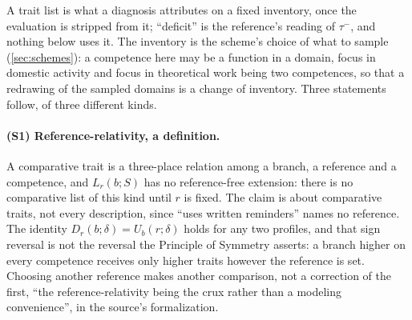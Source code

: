 \noindent A trait list is what a diagnosis attributes on a fixed inventory, once the evaluation is stripped from it; ``deficit'' is the reference's reading of $\tau^{-}$, and nothing below uses it. The inventory is the scheme's choice of what to sample (\autoref{sec:schemes}): a competence here may be a function in a domain, focus in domestic activity and focus in theoretical work being two competences, so that a redrawing of the sampled domains is a change of inventory. Three statements follow, of three different kinds.

\paragraph{(S1) Reference-relativity, a definition.} A comparative trait is a three-place relation among a branch, a reference and a competence, and $L_r(b; S)$ has no reference-free extension: there is no comparative list of this kind until $r$ is fixed. The claim is about comparative traits, not every description, since ``uses written reminders'' names no reference. The identity $D_r(b;\delta) = U_b(r;\delta)$ holds for any two profiles, and that sign reversal is not the reversal the Principle of Symmetry asserts: a branch higher on every competence receives only higher traits however the reference is set. Choosing another reference makes another comparison, not a correction of the first, ``the reference-relativity being the crux rather than a modeling convenience'', in the source's formalization.


